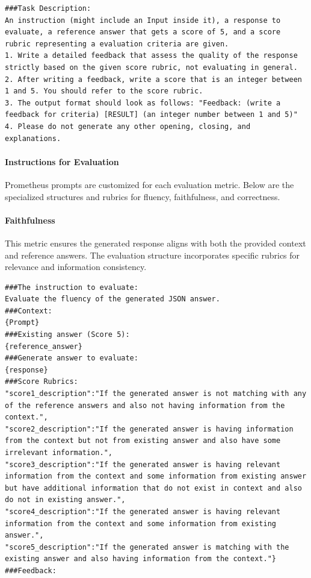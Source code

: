 \begin{lstlisting}[style=textstyle, frame = single, caption=Task description used for evaluation of fluency and correctness \cite{kim2024prometheus2opensource}, label=code:Task-description-fluency-correctness]
###Task Description:
An instruction (might include an Input inside it), a response to evaluate, a reference answer that gets a score of 5, and a score rubric representing a evaluation criteria are given.
1. Write a detailed feedback that assess the quality of the response strictly based on the given score rubric, not evaluating in general.
2. After writing a feedback, write a score that is an integer between 1 and 5. You should refer to the score rubric.
3. The output format should look as follows: "Feedback: (write a feedback for criteria) [RESULT] (an integer number between 1 and 5)"
4. Please do not generate any other opening, closing, and explanations.
\end{lstlisting}

\paragraph{Instructions for Evaluation}

Prometheus prompts are customized for each evaluation metric. Below are the specialized structures and rubrics for fluency, faithfulness, and correctness.

\paragraph{Faithfulness}
This metric ensures the generated response aligns with both the provided context and reference answers. The evaluation structure incorporates specific rubrics for relevance and information consistency.

\begin{lstlisting}[style=textstyle, frame = single, caption=Prompt structured correctness \cite{kim2024prometheus2opensource}, label=code:estructured-faithfulness]
###The instruction to evaluate:
Evaluate the fluency of the generated JSON answer.
###Context:
{Prompt}
###Existing answer (Score 5):
{reference_answer}
###Generate answer to evaluate:
{response}
###Score Rubrics:
"score1_description":"If the generated answer is not matching with any of the reference answers and also not having information from the context.",
"score2_description":"If the generated answer is having information from the context but not from existing answer and also have some irrelevant information.",
"score3_description":"If the generated answer is having relevant information from the context and some information from existing answer but have additional information that do not exist in context and also do not in existing answer.",
"score4_description":"If the generated answer is having relevant information from the context and some information from existing answer.",
"score5_description":"If the generated answer is matching with the existing answer and also having information from the context."}
###Feedback:
\end{lstlisting}

